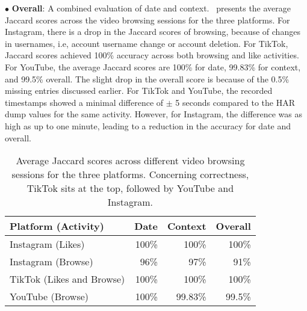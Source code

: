\noindent
$\bullet$ \textbf{Overall}: A combined evaluation of date and context.~ presents the average Jaccard scores across the video browsing sessions for the three platforms.
For Instagram, there is a drop in the Jaccard scores of browsing, because of changes in usernames, i.e, account username change or account deletion.
For TikTok, Jaccard scores achieved 100\% accuracy across both browsing and like activities.
For YouTube, the average Jaccard scores are 100\% for date, 99.83\% for context, and 99.5\% overall.
The slight drop in the overall score is because of the 0.5\% missing entries discussed earlier.
For TikTok and YouTube, the recorded timestamps showed a minimal difference of $\pm$ 5 seconds compared to the HAR dump values for the same activity.
However, for Instagram, the difference was as high as up to one minute, leading to a reduction in the accuracy for date and overall.
\begin{table}[t]
    \centering
    \small
    \begin{tabular}{@{}lrrr@{}}
    \toprule
    \textbf{Platform (Activity)} & \multicolumn{1}{c}{\textbf{Date}} & \multicolumn{1}{c}{\textbf{Context}} & \multicolumn{1}{c}{\textbf{Overall}} \\ \midrule
    Instagram (Likes)            & 100\%                             & 100\%                                & 100\%                                \\
    Instagram (Browse)           & 96\%                              & 97\%                                 & 91\%                                \\
    TikTok (Likes and Browse)     & 100\%                             & 100\%                                & 100\%                                \\
    YouTube (Browse)             & 100\%                             & 99.83\%                              & 99.5\%                               \\ \bottomrule
    \end{tabular}
    \caption{Average Jaccard scores across different video browsing sessions for the three platforms. Concerning correctness, TikTok sits at the top, followed by YouTube and Instagram.}
    \label{tab:correctness}
\end{table}


